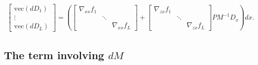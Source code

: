 \documentclass{article}
\begin{document}
\begin{align}
    \begin{bmatrix}
        \mathrm{vec}\left(dD_1\right) \\
        \vdots                        \\
        \mathrm{vec}\left(dD_L\right)
    \end{bmatrix}
    =
    \left(
    \begin{bmatrix}
        \nabla_{xx} f_1 &        &                 \\
                        & \ddots &                 \\
                        &        & \nabla_{xx} f_L
    \end{bmatrix}
    +
    \begin{bmatrix}
        \nabla_{zx} f_1 \\ &\ddots& \\ &&\nabla_{zx} f_L
    \end{bmatrix}
    P M^{-1} D_x
    \right)dx.
\end{align}

\subsection{The term involving $dM$}
\end{document}
